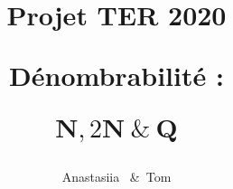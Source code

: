 \newcommand{\deffunct}[5]{%
\begin{align*}%
      #1 \colon & #2 \to #3\\
       &#4\xmapsto{\hphantom{#1}} #5
\end{align*}%
}


\newcommand*{\NN}{\mathbf{N}}
\newcommand*{\ZZ}{\mathbf{Z}}
\newcommand*{\QQ}{\mathbf{Q}}
\newcommand{\HRule}{\rule{\paperwidth}{0.5mm}} %
\newcommand*{\theuniversity}{Université de Toulon}
\newcommand*{\theyearname}{Licence de Mathématiques, parcours mathématiques, 
2\ieme~année}
\newcommand*{\thesupervisor}{Joachim \bsc{Asch}}
\author{Anastasiia ~\&~Tom }
\title{Projet TER 2020\par
            Dénombrabilité : \par $\NN,2\NN \ \& \ \QQ$\par}


\setulmargins{*}{*}{*}
\setheaderspaces{*}{*}{*}
\setlrmargins{*}{*}{*}
\setheadfoot{\headheight}{\footskip}
\checkandfixthelayout[nearest]
\renewcommand*{\sideparfont}{\itshape\footnotesize}
\renewcommand*{\sideparform}{\ifmemtortm\RaggedRight\else\RaggedLeft\fi}


\renewcommand{\cftpartaftersnum}{.}
\renewcommand{\cftchapteraftersnum}{.}
\renewcommand{\cftpartdotsep}{\cftdotsep}
\renewcommand{\cftchapterdotsep}{\cftdotsep}%
\addto\captionsfrench{\renewcommand{\appendixpagename}{Annexes}}
\addto\captionsfrench{\renewcommand{\appendixtocname}{Annexes}}


